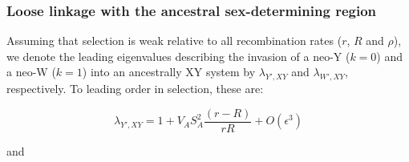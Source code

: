 \documentclass[12pt]{article}
\begin{document}
\subsubsection*{Loose linkage with the ancestral sex-determining region}



Assuming that selection is weak relative to all recombination rates ($r$, $R$ and $\rho$), we denote the leading eigenvalues describing the invasion of a neo-Y ($k=0$) and a neo-W ($k=1$) into an ancestrally XY system by $\lambda_{Y',XY}$ and $\lambda_{W',XY}$, respectively. To leading order in selection, these are:

\begin{equation}
\lambda_{Y',XY} =1+ V_{A}S_{A}^2\frac{ \left( r-R \right) }{r R}+O\left(\epsilon^3 \right) 
\label{eq:lambda_neoY}
\end{equation}

\noindent 
and 
\end{document}
